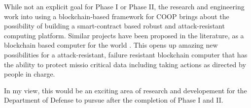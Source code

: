 While not an explicit goal for Phase I or Phase II, the research and engineering work into using a blockchain-based
framework for COOP brings about the possibility of building a smart-contract based robust and attack-resistant computing
platform. Similar projects have been proposed in the literature, as a blockchain based computer for the world
\cite{reyes2018, yahya2019, hanke2018}. This opens up amazing new possibilities for a attack-resistant, failure
resistant blockchain computer that has the ability to protect missio critical data including taking actions as directed
by people in charge.

In my view, this would be an exciting area of research and developement for the Department of Defense to pursue after the completion
of Phase I and II.

